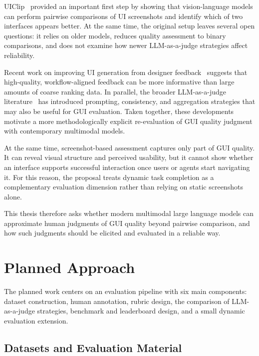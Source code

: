 \documentclass[pdflatex,sn-mathphys-num]{sn-jnl}
\begin{document}
UIClip~\cite{uiclip} provided an important first step by showing that vision-language
models can perform pairwise comparisons of UI screenshots and identify which of two
interfaces appears better. At the same time, the original setup leaves several open
questions: it relies on older models, reduces quality assessment to binary comparisons,
and does not examine how newer LLM-as-a-judge strategies affect reliability.

Recent work on improving UI generation from designer feedback~\cite{designer_feedback}
suggests that high-quality, workflow-aligned feedback can be more informative than
large amounts of coarse ranking data. In parallel, the broader LLM-as-a-judge
literature~\cite{llm_judge} has introduced prompting, consistency, and aggregation
strategies that may also be useful for GUI evaluation. Taken together, these
developments motivate a more methodologically explicit re-evaluation of GUI quality
judgment with contemporary multimodal models.

At the same time, screenshot-based assessment captures only part of GUI quality. It
can reveal visual structure and perceived usability, but it cannot show whether an
interface supports successful interaction once users or agents start navigating it. For
this reason, the proposal treats dynamic task completion as a complementary evaluation
dimension rather than relying on static screenshots alone.

This thesis therefore asks whether modern multimodal large language models can
approximate human judgments of GUI quality beyond pairwise comparison, and how such
judgments should be elicited and evaluated in a reliable way.

\section{Planned Approach}\label{sec:approach}

The planned work centers on an evaluation pipeline with six main components: dataset
construction, human annotation, rubric design, the comparison of LLM-as-a-judge
strategies, benchmark and leaderboard design, and a small dynamic evaluation
extension.

\subsection{Datasets and Evaluation Material}
\end{document}
